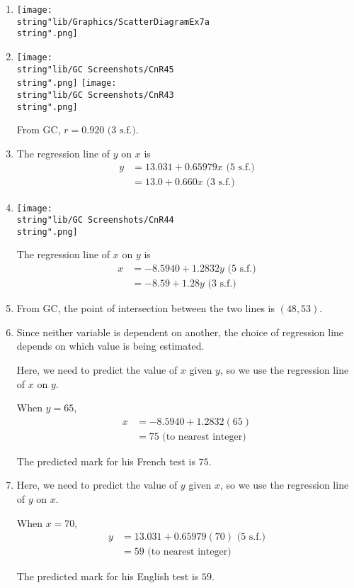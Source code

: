 \documentclass[11pt,a4paper]{book}
\begin{document}
\begin{example}
\begin{enumerate}[label=(\alph*)]

\item  \texttt{[image: \\string"lib/Graphics/ScatterDiagramEx7a\\string".png]}

\item  \texttt{[image: \\string"lib/GC Screenshots/CnR45\\string".png]}
\hspace{1cm}\texttt{[image: \\string"lib/GC Screenshots/CnR43\\string".png]}

From GC, $r=0.920\text{ (3 s.f.)}$.

\item  The regression line of $y$ on $x$ is
\begin{align*}
y & =13.031+0.65979x\text{ (5 s.f.)}\\
 & =13.0+0.660x\text{ (3 s.f.)}
\end{align*}

\item  \texttt{[image: \\string"lib/GC Screenshots/CnR44\\string".png]}

The regression line of $x$ on $y$ is
\begin{align*}
x & =-8.5940+1.2832y\text{ (5 s.f.)}\\
 & =-8.59+1.28y\text{ (3 s.f.)}
\end{align*}

\item  From GC, the point of intersection between the two lines is
$\left(48,53\right)$.

\item Since neither variable is dependent on another, the choice
of regression line depends on which value is being estimated.

Here, we need to predict the value of $x$ given $y$, so we use the
regression line of $x$ on $y$.

When $y=65$,
\begin{align*}
x & =-8.5940+1.2832\left(65\right)\\
 & =75\text{ (to nearest integer)}
\end{align*}

The predicted mark for his French test is $75$.

\item  Here, we need to predict the value of $y$ given $x$, so
we use the regression line of $y$ on $x$.

When $x=70$,
\begin{align*}
y & =13.031+0.65979\left(70\right)\text{ (5 s.f.)}\\
 & =59\text{ (to nearest integer)}
\end{align*}

The predicted mark for his English test is $59$.

\end{enumerate}

\end{example}
\end{document}
